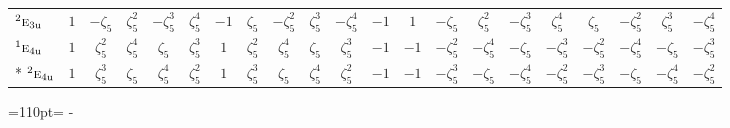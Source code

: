 \documentclass[10pt,a4paper]{article}
\newcommand{\needspace}[1]{\par\penalty-100\begingroup\dimen0=#1\relax\dimen2=\pagegoal
  \advance\dimen2-\pagetotal\ifdim\dimen0>\dimen2\relax\ifdim\dimen2>0pt\vfil\break\fi\fi
  \endgroup}
\numberwithin{equation}{section}
\newcommand{\irr}[1]{\text{\normalfont\scshape #1}}
\newcommand{\conjpair}[1]{{}^{#1}}
\newcommand{\ptag}[1]{\mathrm{#1}}
\newcommand{\rootunity}[1]{\zeta_{#1}}
\begin{document}
{\begin{longtable}{@{}lcccccccccccccccccccc@{}}
$\conjpair{2}\irr{e}_{3\ptag{u}}$ & $1$ & $-\rootunity{5}$ & $\rootunity{5}^{2}$ & $-\rootunity{5}^{3}$ & $\rootunity{5}^{4}$ & $-1$ & $\rootunity{5}$ & $-\rootunity{5}^{2}$ & $\rootunity{5}^{3}$ & $-\rootunity{5}^{4}$ & $-1$ & $1$ & $-\rootunity{5}$ & $\rootunity{5}^{2}$ & $-\rootunity{5}^{3}$ & $\rootunity{5}^{4}$ & $\rootunity{5}$ & $-\rootunity{5}^{2}$ & $\rootunity{5}^{3}$ & $-\rootunity{5}^{4}$\\
$\conjpair{1}\irr{e}_{4\ptag{u}}$ & $1$ & $\rootunity{5}^{2}$ & $\rootunity{5}^{4}$ & $\rootunity{5}$ & $\rootunity{5}^{3}$ & $1$ & $\rootunity{5}^{2}$ & $\rootunity{5}^{4}$ & $\rootunity{5}$ & $\rootunity{5}^{3}$ & $-1$ & $-1$ & $-\rootunity{5}^{2}$ & $-\rootunity{5}^{4}$ & $-\rootunity{5}$ & $-\rootunity{5}^{3}$ & $-\rootunity{5}^{2}$ & $-\rootunity{5}^{4}$ & $-\rootunity{5}$ & $-\rootunity{5}^{3}$\\*
$\conjpair{2}\irr{e}_{4\ptag{u}}$ & $1$ & $\rootunity{5}^{3}$ & $\rootunity{5}$ & $\rootunity{5}^{4}$ & $\rootunity{5}^{2}$ & $1$ & $\rootunity{5}^{3}$ & $\rootunity{5}$ & $\rootunity{5}^{4}$ & $\rootunity{5}^{2}$ & $-1$ & $-1$ & $-\rootunity{5}^{3}$ & $-\rootunity{5}$ & $-\rootunity{5}^{4}$ & $-\rootunity{5}^{2}$ & $-\rootunity{5}^{3}$ & $-\rootunity{5}$ & $-\rootunity{5}^{4}$ & $-\rootunity{5}^{2}$\\
\bottomrule\end{longtable}}
\needspace{110pt}
\end{document}
